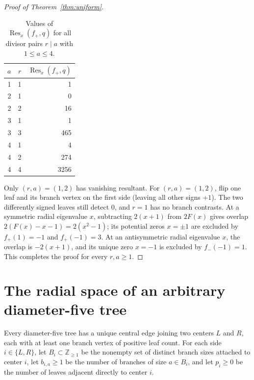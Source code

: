 \documentclass[11pt]{article}
\theoremstyle{plain}
\theoremstyle{remark}
\DeclareMathOperator{\Res}{Res}
\begin{document}
\begin{proof}[Proof of Theorem~\ref{thm:uniform}]
\begin{table}[ht]
\centering
\caption{Values of $\Res_x(f_+, q)$ for all divisor pairs $r \mid a$ with $1 \leq a \leq 4$.}\label{tab:res-tra}
\begin{tabular}{rrr}
\toprule
$a$ & $r$ & $\Res_x(f_+, q)$ \\
\midrule
1 & 1 & 1 \\
2 & 1 & 0 \\
2 & 2 & 16 \\
3 & 1 & 1 \\
3 & 3 & 465 \\
4 & 1 & 4 \\
4 & 2 & 274 \\
4 & 4 & 3256 \\
\bottomrule
\end{tabular}
\end{table}

Only $(r,a) = (1,2)$ has vanishing resultant. For $(r,a) = (1,2)$, flip one
leaf and its branch vertex on the first side (leaving all other signs $+1$).
The two differently signed leaves still detect $0$, and $r = 1$ has no branch
contrasts. At a symmetric radial eigenvalue $x$, subtracting $2(x+1)$ from
$2F(x)$ gives overlap $2(F(x) - x - 1) = 2(x^2 - 1)$; its potential zeros
$x = \pm 1$ are excluded by $f_+(1) = -1$ and $f_+(-1) = 3$. At an
antisymmetric radial eigenvalue $x$, the overlap is $-2(x+1)$, and its unique
zero $x = -1$ is excluded by $f_-(-1) = 1$. This completes the proof for every
$r,a \geq 1$.
\end{proof}

\section{The radial space of an arbitrary diameter-five tree}\label{sec:radial}

Every diameter-five tree has a unique central edge joining two centers
$L$ and $R$, each with at least one branch vertex of positive leaf count. For
each side $i \in \{L,R\}$, let $B_i \subset \mathbb{Z}_{\geq 1}$ be the
nonempty set of distinct branch sizes attached to center $i$, let
$b_{i,a} \geq 1$ be the number of branches of size $a \in B_i$, and let
$p_i \geq 0$ be the number of leaves adjacent directly to center $i$.
\end{document}
